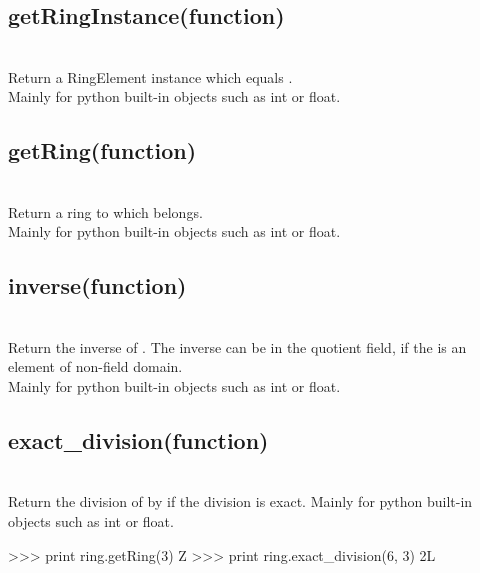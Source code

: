   \subsection{getRingInstance(function)}
  \\
   \spacing
   \quad  Return a RingElement instance which equals .\\
   \spacing
   \quad Mainly for python built-in objects such as int or float.\\
   \spacing
  \subsection{getRing(function)}
  \\
   \spacing
   \quad  Return a ring to which  belongs.\\
   \spacing
   \quad Mainly for python built-in objects such as int or float.\\
   \spacing
  \subsection{inverse(function)}
  \\
   \spacing
   \quad  Return the inverse of .
   The inverse can be in the quotient field,
   if the  is an element of non-field domain.\\
   \spacing
   \quad Mainly for python built-in objects such as int or float.\\
   \spacing
  \subsection{exact\_division(function)}
  \\
   \spacing
   \quad  Return the division of  by  if the division is exact.
   \spacing
   \quad Mainly for python built-in objects such as int or float.\\
   \spacing
\begin{ex}
>>> print ring.getRing(3)
Z
>>> print ring.exact_division(6, 3)
2L
\end{ex}%
\C



